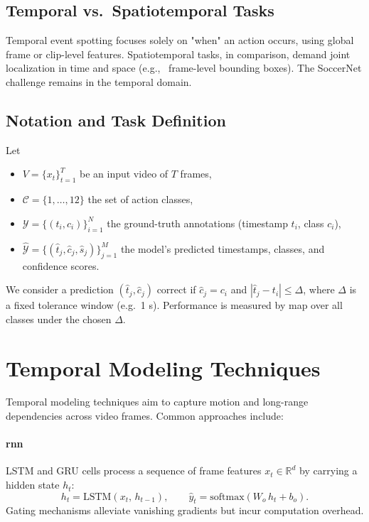 \subsection{Temporal vs.\ Spatiotemporal Tasks}
Temporal event spotting focuses solely on "when" an action occurs, using global frame or clip-level features. Spatiotemporal tasks, in comparison, demand joint localization in time and space (e.g., \ frame-level bounding boxes). The SoccerNet challenge remains in the temporal domain.

\subsection{Notation and Task Definition}
Let
\begin{itemize}
  \item $V=\{x_t\}_{t=1}^T$ be an input video of $T$ frames,
  \item $\mathcal{C}=\{1,\dots,12\}$ the set of action classes,
  \item $\mathcal{Y}=\{(t_i,c_i)\}_{i=1}^N$ the ground-truth annotations (timestamp $t_i$, class $c_i$),
  \item $\hat{\mathcal{Y}}=\{(\hat t_j,\hat c_j,\hat s_j)\}_{j=1}^M$ the model's predicted timestamps, classes, and confidence scores.
\end{itemize}
We consider a prediction $(\hat t_j,\hat c_j)$ correct if $\hat c_j=c_i$ and $|\hat t_j - t_i|\le\Delta$, where $\Delta$ is a fixed tolerance window (e.g.\ 1 s). Performance is measured by \acrfull{map} over all classes under the chosen $\Delta$.

\section{Temporal Modeling Techniques}
\label{sec:temporal_models}

Temporal modeling techniques aim to capture motion and long-range dependencies across video frames. Common approaches include: 

\paragraph{\acrfull{rnn}}  
LSTM and GRU cells process a sequence of frame features \(x_t\in\mathbb{R}^d\) by carrying a hidden state \(h_t\):
\[
h_t = \mathrm{LSTM}(x_t,\,h_{t-1}), 
\qquad
\hat y_t = \mathrm{softmax}(W_o\,h_t + b_o).
\]
Gating mechanisms alleviate vanishing gradients but incur computation overhead.


